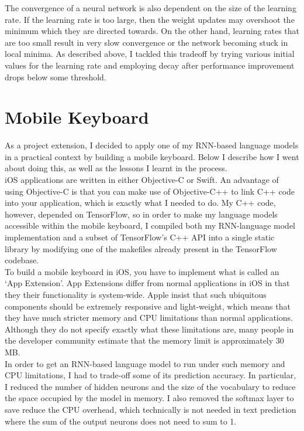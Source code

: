 \documentclass[a4paper, 12pt]{report}
\begin{document}
The convergence of a neural network is also dependent on the size of the learning rate. If the learning rate is too large, then the weight updates may overshoot the minimum which they are directed towards. On the other hand, learning rates that are too small result in very slow convergence or the network becoming stuck in local minima. As described above, I tackled this tradeoff by trying various initial values for the learning rate and employing decay after performance improvement drops below some threshold.

\section{Mobile Keyboard} \label{mobile_keyboard}

As a project extension, I decided to apply one of my RNN-based language models in a practical context by building a mobile keyboard. Below I describe how I went about doing this, as well as the lessons I learnt in the process. \\

iOS applications are written in either Objective-C or Swift. An advantage of using Objective-C is that you can make use of Objective-C++ to link C++ code into your application, which is exactly what I needed to do. My C++ code, however, depended on TensorFlow, so in order to make my language models accessible within the mobile keyboard, I compiled both my RNN-language model implementation and a subset of TensorFlow's C++ API into a single static library by modifying one of the makefiles already present in the TensorFlow codebase. \\

To build a mobile keyboard in iOS, you have to implement what is called an `App Extension'. App Extensions differ from normal applications in iOS in that they their functionality is system-wide. Apple insist that such ubiquitous components should be extremely responsive and light-weight, which means that they have much stricter memory and CPU limitations than normal applications. Although they do not specify exactly what these limitations are, many people in the developer community estimate that the memory limit is approximately 30 MB. \\

In order to get an RNN-based language model to run under such memory and CPU limitations, I had to trade-off some of its prediction accuracy. In particular, I reduced the number of hidden neurons and the size of the vocabulary to reduce the space occupied by the model in memory. I also removed the softmax layer to save reduce the CPU overhead, which technically is not needed in text prediction where the sum of the output neurons does not need to sum to 1.
\end{document}

